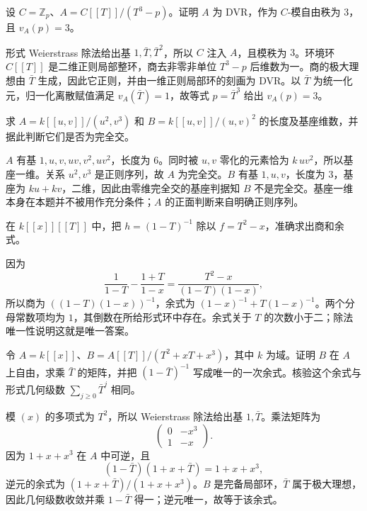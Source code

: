\begin{exercise}\label{b3:ex:D-ramified-model}
	设 \(C=\mathbb Z_p\)、\(A=C[\![T]\!]/(T^3-p)\)。证明 \(A\) 为 DVR，作为 \(C\)-模自由秩为 \(3\)，且 \(v_A(p)=3\)。
\end{exercise}
\begin{solution}
	形式 Weierstrass 除法给出基 \(1,\bar T,\bar T^2\)，所以 \(C\) 注入 \(A\)，且模秩为 \(3\)。环境环 \(C[\![T]\!]\) 是二维正则局部整环，商去非零非单位 \(T^3-p\) 后维数为一。商的极大理想由 \(\bar T\) 生成，因此它正则，并由一维正则局部环的刻画为 DVR。以 \(\bar T\) 为统一化元，归一化离散赋值满足 \(v_A(\bar T)=1\)，故等式 \(p=\bar T^3\) 给出 \(v_A(p)=3\)。
\end{solution}

\begin{exercise}\label{b3:ex:D-artinian-ci-models}
	求 \(A=k[\![u,v]\!]/(u^2,v^3)\) 和 \(B=k[\![u,v]\!]/(u,v)^2\) 的长度及基座维数，并据此判断它们是否为完全交。
\end{exercise}
\begin{solution}
	\(A\) 有基 \(1,u,v,uv,v^2,uv^2\)，长度为 \(6\)。同时被 \(u,v\) 零化的元素恰为 \(k\,uv^2\)，所以基座一维。关系 \(u^2,v^3\) 是正则序列，故 \(A\) 为完全交。\(B\) 有基 \(1,u,v\)，长度为 \(3\)，基座为 \(ku+kv\)，二维，因此由零维完全交的基座判据知 \(B\) 不是完全交。基座一维本身在本题并不被用作充分条件；\(A\) 的正面判断来自明确正则序列。
\end{solution}

\begin{exercise}\label{b3:ex:D-explicit-series-division}
	在 \(k[\![x]\!][\![T]\!]\) 中，把 \(h=(1-T)^{-1}\) 除以 \(f=T^2-x\)，准确求出商和余式。
\end{exercise}
\begin{solution}
	因为
	\[
		\frac1{1-T}-\frac{1+T}{1-x} =\frac{T^2-x}{(1-T)(1-x)},
	\]
	所以商为 \(((1-T)(1-x))^{-1}\)，余式为 \((1-x)^{-1}+T(1-x)^{-1}\)。两个分母常数项均为 \(1\)，其倒数在所给形式环中存在。余式关于 \(T\) 的次数小于二；除法唯一性说明这就是唯一答案。
\end{solution}

\begin{exercise}\label{b3:ex:D-weierstrass-hypothesis}
	令 \(A=k[\![x]\!]\)、\(B=A[\![T]\!]/(T^2+xT+x^3)\)，其中 \(k\) 为域。证明 \(B\) 在 \(A\) 上自由，求乘 \(\bar T\) 的矩阵，并把 \((1-\bar T)^{-1}\) 写成唯一的一次余式。核验这个余式与形式几何级数 \(\sum_{j\ge0}\bar T^j\) 相同。
\end{exercise}
\begin{solution}
	模 \((x)\) 的多项式为 \(T^2\)，所以 Weierstrass 除法给出基 \(1,\bar T\)。乘法矩阵为
	\[
		\begin{pmatrix}0&-x^3\\1&-x\end{pmatrix}.
	\]
	因为 \(1+x+x^3\) 在 \(A\) 中可逆，且
	\[
		(1-\bar T)(1+x+\bar T)=1+x+x^3,
	\]
	逆元的余式为 \((1+x+\bar T)/(1+x+x^3)\)。\(B\) 是完备局部环，\(\bar T\) 属于极大理想，因此几何级数收敛并乘 \(1-\bar T\) 得一；逆元唯一，故等于该余式。
\end{solution}

